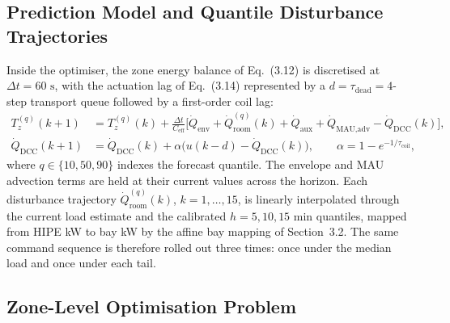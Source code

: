 \subsection{Prediction Model and Quantile Disturbance Trajectories}

Inside the optimiser, the zone energy balance of Eq.~(3.12) is discretised at $\Delta t = 60\text{ s}$, with the actuation lag of Eq.~(3.14) represented by a $d = \tau_{\text{dead}} = 4$-step transport queue followed by a first-order coil lag:
\begin{align}
T_z^{(q)}(k+1) &= T_z^{(q)}(k) + \frac{\Delta t}{C_{\text{eff}}}\Big[\dot{Q}_{\text{env}} + \dot{Q}^{(q)}_{\text{room}}(k) + \dot{Q}_{\text{aux}} + \dot{Q}_{\text{MAU,adv}} - \dot{Q}_{\text{DCC}}(k)\Big], \label{eq:mpc_T}\\
\dot{Q}_{\text{DCC}}(k+1) &= \dot{Q}_{\text{DCC}}(k) + \alpha\big(u(k-d) - \dot{Q}_{\text{DCC}}(k)\big), \qquad \alpha = 1 - e^{-1/\tau_{\text{coil}}}, \label{eq:mpc_coil}
\end{align}
where $q \in \{10, 50, 90\}$ indexes the forecast quantile. The envelope and MAU advection terms are held at their current values across the horizon. Each disturbance trajectory $\dot{Q}^{(q)}_{\text{room}}(k)$, $k = 1,\dots,15$, is linearly interpolated through the current load estimate and the calibrated $h = 5, 10, 15\text{ min}$ quantiles, mapped from HIPE kW to bay kW by the affine bay mapping of Section~3.2. The same command sequence is therefore rolled out three times: once under the median load and once under each tail.

\subsection{Zone-Level Optimisation Problem}

